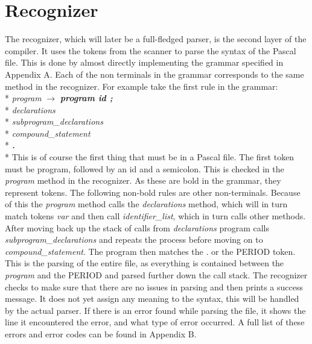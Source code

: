 \documentclass[12pt]{scrreprt}
\newcommand{\tab}{\hspace*{2em}}
\begin{document}
\chapter{Recognizer}
The recognizer, which will later be a full-fledged parser, is the second layer of the 
compiler. It uses the tokens from the scanner to parse the syntax of the Pascal file. This 
is done by almost directly implementing the grammar specified in Appendix A. Each of the
non terminals in the grammar corresponds to the same method in the recognizer. For example 
take the first rule in the grammar: \\*
\textit{program} $\rightarrow$ \tab\hspace{4mm}\textit{\textbf{program id ;}}\\*
\tab\tab\tab\tab\textit{declarations}\\*
\tab\tab\tab\tab\textit{subprogram\_declarations}\\*
\tab\tab\tab\tab\textit{compound\_statement}\\*
\tab\tab\tab\tab\textit{\textbf{.}}\\*
This is of course the first thing that must be in a Pascal file. The first token must be 
program, followed by an id and a semicolon. This is checked in the \textit{program} method 
in the recognizer. As these are bold in the grammar, they represent tokens. The following 
non-bold rules are other non-terminals. Because of this the \textit{program} method calls 
the \textit{declarations} method, which will in turn match tokens \textit{var} and then 
call \textit{identifier\_list}, which in turn calls other methods. After moving back up the
stack of calls from \textit{declarations} program calls \textit{subprogram\_declarations} 
and repeats the process before moving on to \textit{compound\_statement}. The program then 
matches the . or the PERIOD token. This is the parsing of the entire file, 
as everything is contained between the \textit{program} and the PERIOD and parsed 
further down the call stack. The recognizer checks to make sure that there are no issues in
 parsing and then prints a success message. It does not yet assign any meaning to the 
syntax, this will be handled by the actual parser. If there is an error found while parsing
the file, it shows the line it encountered the error, and what type of error occurred. A 
full list of these errors and error codes can be found in Appendix B. 
\end{document}
